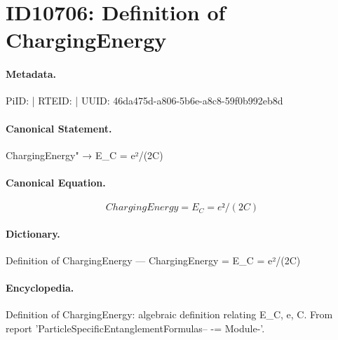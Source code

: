 \section*{ID10706: Definition of ChargingEnergy}
\paragraph{Metadata.}
PiID:  | RTEID:  | UUID: 46da475d-a806-5b6e-a8c8-59f0b992eb8d

\paragraph{Canonical Statement.}
ChargingEnergy" → E\_C = e²/(2C)

\paragraph{Canonical Equation.}
\[
ChargingEnergy = E_C = e²/(2C)
\]

\paragraph{Dictionary.}
Definition of ChargingEnergy — ChargingEnergy = E\_C = e²/(2C)

\paragraph{Encyclopedia.}
Definition of ChargingEnergy: algebraic definition relating E\_C, e, C. From report 'ParticleSpecificEntanglementFormulas-- -= Module-'.
